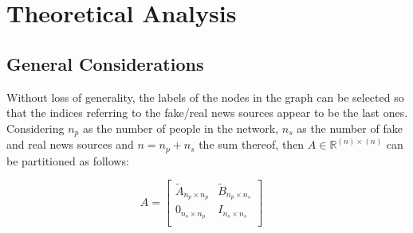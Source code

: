 \section{Theoretical Analysis}
\subsection{General Considerations}
Without loss of generality, the labels of the nodes in the graph can be selected so that the indices referring to the fake/real news sources appear to be the last ones. Considering $n_p$ as the number of people in the network, $n_s$ as the number of fake and real news sources and $n = n_p + n_s$ the sum thereof, then $A \in \mathbb{R}^{ (n) \times (n)}$ can be partitioned as follows:

$$
A = 
\begin{bmatrix}
	\tilde{A}_{n_p \times n_p} & \tilde{B}_{n_p \times n_s} \\
	0_{n_s \times n_p} & I_{n_s \times n_s} \\
\end{bmatrix} 
\quad
$$


